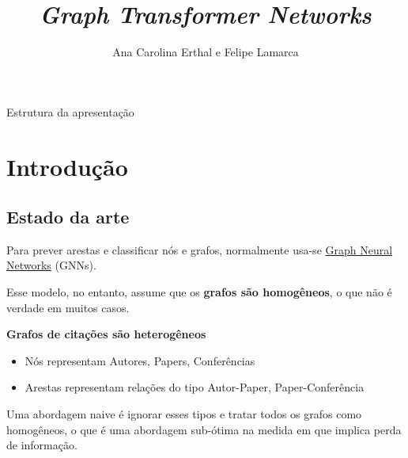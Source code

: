 \documentclass[12pt,notheorems,hyperref={pdfauthor=whatever}]{beamer}
\title[
]{\textit{Graph Transformer Networks}}
\subtitle{\cite{DBLP:journals/corr/abs-1911-06455}}
\author[
]{
    Ana Carolina Erthal e Felipe Lamarca
}
\institute{
    Escola de Matemática Aplicada \\
    Fundação Getulio Vargas}
\date{}
\begin{document}
{
\begin{frame}
  \titlepage
\end{frame}
}
\addtocounter{framenumber}{-1}

\begin{frame}{Estrutura da apresentação}
    \tableofcontents
\end{frame}


\section{Introdução}


\subsection{Estado da arte}
\begin{frame}

    Para prever arestas e classificar nós e grafos, normalmente usa-se \underline{Graph Neural Networks} (GNNs).
    
    \vspace{10pt}

    Esse modelo, no entanto, assume que os \textbf{grafos são homogêneos}, o que não é verdade em muitos casos.

    \vspace{10pt}


    \begin{description}
        \item[\textbf{Grafos de citações são heterogêneos}]
    \end{description}
    \begin{itemize}
        \item Nós representam Autores, Papers, Conferências
        \item Arestas representam relações do tipo Autor-Paper, Paper-Conferência
    \end{itemize}

    \vspace{10pt}


    Uma abordagem naive é ignorar esses tipos e tratar todos os grafos como homogêneos, o que é uma abordagem sub-ótima na medida em que implica perda de informação.

    
\end{frame}
\end{document}
